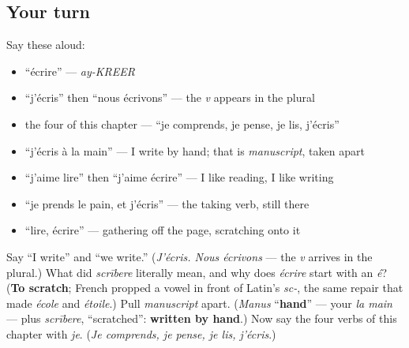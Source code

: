 \subsection*{Your turn}
Say these aloud:

\begin{itemize}
\raggedright
  \item \textquotedblleft{}écrire\textquotedblright{} — \emph{ay-KREER}
  \item \textquotedblleft{}j'écris\textquotedblright{} then \textquotedblleft{}nous écrivons\textquotedblright{} — the \emph{v} appears in the plural
  \item the four of this chapter — \textquotedblleft{}je comprends, je pense, je lis, j'écris\textquotedblright{}
  \item \textquotedblleft{}j'écris à la main\textquotedblright{} — I write by hand; that is \emph{manuscript}, taken apart
  \item \textquotedblleft{}j'aime lire\textquotedblright{} then \textquotedblleft{}j'aime écrire\textquotedblright{} — I like reading, I like writing
  \item \textquotedblleft{}je prends le pain, et j'écris\textquotedblright{} — the taking verb, still there
  \item \textquotedblleft{}lire, écrire\textquotedblright{} — gathering off the page, scratching onto it
\end{itemize}

\begin{tcolorbox}[breakable,colback=teal!4,colframe=teal!35!black,title={Before you move on}]
Say \textquotedblleft{}I write\textquotedblright{} and \textquotedblleft{}we write.\textquotedblright{} (\emph{J'écris. Nous écrivons} — the \emph{v} arrives in the plural.) What did \emph{scrībere} literally mean, and why does \emph{écrire} start with an \emph{é}? (\textbf{To scratch}; French propped a vowel in front of Latin's \emph{sc-}, the same repair that made \emph{école} and \emph{étoile}.) Pull \emph{manuscript} apart. (\emph{Manus} \textquotedblleft{}\textbf{hand}\textquotedblright{} — your \emph{la main} — plus \emph{scrībere}, \textquotedblleft{}scratched\textquotedblright{}: \textbf{written by hand}.) Now say the four verbs of this chapter with \emph{je}. (\emph{Je comprends, je pense, je lis, j'écris}.)
\end{tcolorbox}
